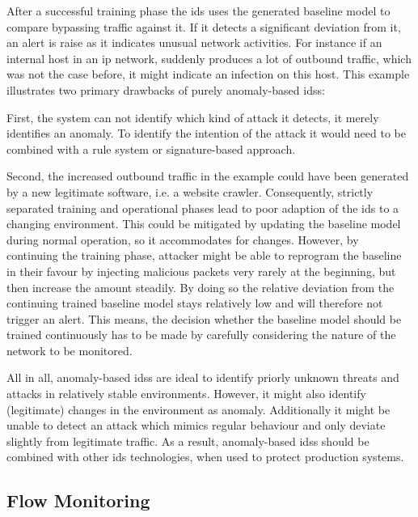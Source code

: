 After a successful training phase the \gls{ids} uses the generated baseline model to compare bypassing traffic against it.
If it detects a significant deviation from it, an alert is raise as it indicates unusual network activities.
For instance if an internal host in an \gls{ip} network, suddenly produces a lot of outbound traffic, which was not the case before, it might indicate an infection on this host.
This example illustrates two primary drawbacks of purely anomaly-based \glspl{ids}:

First, the system can not identify which kind of attack it detects, it merely identifies an anomaly. To identify the intention of the attack it would need to be combined with a rule system or signature-based approach.

Second, the increased outbound traffic in the example could have been generated by a new legitimate software, i.e. a website crawler.
Consequently, strictly separated training and operational phases lead to poor adaption of the \gls{ids} to a changing environment.
This could be mitigated by updating the baseline model during normal operation, so it accommodates for changes.
However, by continuing the training phase, attacker might be able to reprogram the baseline in their favour by injecting malicious packets very rarely at the beginning, but then increase the amount steadily.
By doing so the relative deviation from the continuing trained baseline model stays relatively low and will therefore not trigger an alert.
This means, the decision whether the baseline model should be trained continuously has to be made by carefully considering the nature of the network to be monitored.

All in all, anomaly-based \glspl{ids} are ideal to identify priorly unknown threats and attacks in relatively stable environments. However, it might also identify (legitimate) changes in the environment as anomaly. Additionally it might be unable to detect  an attack which mimics regular behaviour and only deviate slightly from legitimate traffic.
As a result, anomaly-based \glspl{ids} should be combined with other \gls{ids} technologies, when used to protect production systems.
\parencite[cf.][pp.~203-204]{Northcutt2005}

\subsection{Flow Monitoring}
\label{sec:background:network:netflow}

